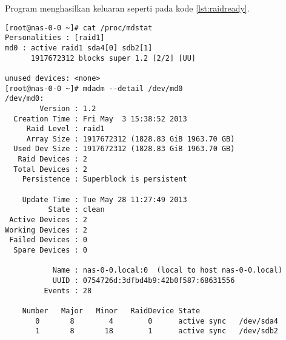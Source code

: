 Program menghasilkan keluaran seperti pada kode \ref{lst:raidready}. 

\begin{minipage}{\linewidth}
\begin{lstlisting}[caption={Keluaran output},label={lst:raidready}]
[root@nas-0-0 ~]# cat /proc/mdstat 
Personalities : [raid1] 
md0 : active raid1 sda4[0] sdb2[1]
      1917672312 blocks super 1.2 [2/2] [UU]
      
unused devices: <none>
[root@nas-0-0 ~]# mdadm --detail /dev/md0 
/dev/md0:
        Version : 1.2
  Creation Time : Fri May  3 15:38:52 2013
     Raid Level : raid1
     Array Size : 1917672312 (1828.83 GiB 1963.70 GB)
  Used Dev Size : 1917672312 (1828.83 GiB 1963.70 GB)
   Raid Devices : 2
  Total Devices : 2
    Persistence : Superblock is persistent

    Update Time : Tue May 28 11:27:49 2013
          State : clean 
 Active Devices : 2
Working Devices : 2
 Failed Devices : 0
  Spare Devices : 0

           Name : nas-0-0.local:0  (local to host nas-0-0.local)
           UUID : 0754726d:3dfbd4b9:42b0f587:68631556
         Events : 28

    Number   Major   Minor   RaidDevice State
       0       8        4        0      active sync   /dev/sda4
       1       8       18        1      active sync   /dev/sdb2
\end{lstlisting}
\end{minipage}

